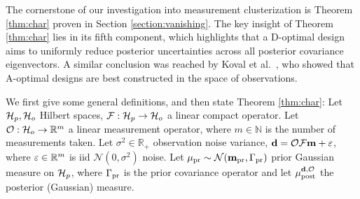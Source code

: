 The cornerstone of our investigation into measurement clusterization
is Theorem \ref{thm:char} proven in Section
\ref{section:vanishing}. The key insight of Theorem \ref{thm:char}
lies in its fifth component, which highlights that a D-optimal design
aims to uniformly reduce posterior uncertainties across all posterior
covariance eigenvectors. A similar conclusion was reached by Koval et
al.~\cite{koval2020}, who showed that A-optimal designs are best
constructed in the space of observations.

We first give some general definitions, and then state Theorem
\ref{thm:char}: Let $\mathcal{H}_p, \mathcal{H}_o$ Hilbert spaces, $\mathcal{F}:\mathcal{H}_p \to
\mathcal{H}_o$ a linear compact operator. Let $\mathcal{O}: \mathcal{H}_o \to \mathbb{R}^m$ a
linear measurement operator, where $m \in \mathbb{N}$ is the number of
measurements taken. Let $\sigma^2 \in \mathbb{R}_{+}$ observation
noise variance, $\mathbf{d} = \mathcal{O} \mathcal{F} \mathbf{m} + \varepsilon$, where $\varepsilon \in
\mathbb{R}^m$ is iid $\mathcal{N}(0, \sigma^2)$ noise. Let $\mu_{\textup{pr}} \sim
\mathcal{N}(\mathbf{m}_{\textup{pr}}, \Gamma_{\textup{pr}})$ prior Gaussian measure on $\mathcal{H}_p$, where
$\Gamma_{\textup{pr}}$ is the prior covariance operator and let $\mu_{\textup{post}}^{\mathbf{d}, \mathcal{O}}$ the
posterior (Gaussian) measure.
  
